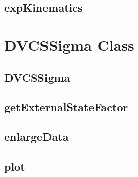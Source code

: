 \documentclass{book}
\begin{document}
\section{expKinematics}

\chapter{DVCSSigma Class}

\section{DVCSSigma}

\section{getExternalStateFactor}

\section{enlargeData}

\section{plot}
\end{document}
